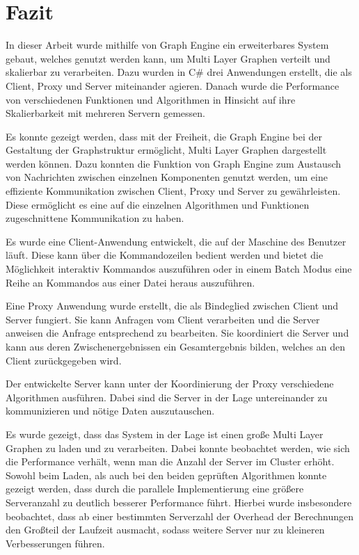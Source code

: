 \chapter{Fazit}

In dieser Arbeit wurde mithilfe von Graph Engine ein erweiterbares System gebaut, welches genutzt werden kann, um Multi Layer Graphen verteilt und skalierbar zu verarbeiten.
Dazu wurden in C\# drei Anwendungen erstellt, die als Client, Proxy und Server miteinander agieren.
Danach wurde die Performance von verschiedenen Funktionen und Algorithmen in Hinsicht auf ihre Skalierbarkeit mit mehreren Servern gemessen.


Es konnte gezeigt werden, dass mit der Freiheit, die Graph Engine bei der Gestaltung der Graphstruktur ermöglicht, Multi Layer Graphen dargestellt werden können.
Dazu konnten die Funktion von Graph Engine zum Austausch von Nachrichten zwischen einzelnen Komponenten genutzt werden, um eine effiziente Kommunikation zwischen Client, Proxy und Server zu gewährleisten. 
Diese ermöglicht es eine auf die einzelnen Algorithmen und Funktionen zugeschnittene Kommunikation zu haben.


Es wurde eine Client-Anwendung entwickelt, die auf der Maschine des Benutzer läuft. Diese kann über die Kommandozeilen bedient werden und bietet die Möglichkeit interaktiv Kommandos auszuführen oder in einem Batch Modus eine Reihe an Kommandos aus einer Datei heraus auszuführen.

Eine Proxy Anwendung wurde erstellt, die als Bindeglied zwischen Client und Server fungiert. Sie kann Anfragen vom Client verarbeiten und die Server anweisen die Anfrage entsprechend zu bearbeiten. Sie koordiniert die Server und kann aus deren Zwischenergebnissen ein Gesamtergebnis bilden, welches an den Client zurückgegeben wird.

Der entwickelte Server kann unter der Koordinierung der Proxy verschiedene Algorithmen ausführen. Dabei sind die Server in der Lage untereinander zu kommunizieren und nötige Daten auszutauschen.


Es wurde gezeigt, dass das System in der Lage ist einen große Multi Layer Graphen zu laden und zu verarbeiten. Dabei konnte beobachtet werden, wie sich die Performance verhält, wenn man die Anzahl der Server im Cluster erhöht.
Sowohl beim Laden, als auch bei den beiden geprüften Algorithmen konnte gezeigt werden, dass durch die parallele Implementierung eine größere Serveranzahl zu deutlich besserer Performance führt.
Hierbei wurde insbesondere beobachtet, dass ab einer bestimmten Serverzahl der Overhead der Berechnungen den Großteil der Laufzeit ausmacht, sodass weitere Server nur zu kleineren Verbesserungen führen.


